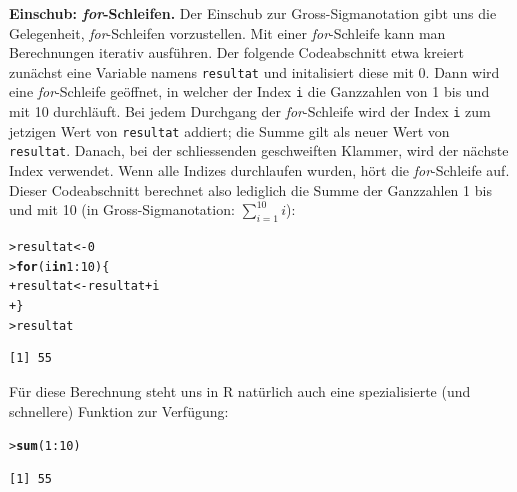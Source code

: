 \documentclass[oneside, 10pt]{book}\usepackage[]{graphicx}\usepackage[]{xcolor}
\makeatletter
\newcommand{\hlnum}[1]{\textcolor[rgb]{0.686,0.059,0.569}{#1}}%
\newcommand{\hlopt}[1]{\textcolor[rgb]{0,0,0}{#1}}%
\newcommand{\hlstd}[1]{\textcolor[rgb]{0.345,0.345,0.345}{#1}}%
\newcommand{\hlkwa}[1]{\textcolor[rgb]{0.161,0.373,0.58}{\textbf{#1}}}%
\newcommand{\hlkwb}[1]{\textcolor[rgb]{0.69,0.353,0.396}{#1}}%
\newcommand{\hlkwd}[1]{\textcolor[rgb]{0.737,0.353,0.396}{\textbf{#1}}}%
\newenvironment{kframe}{%
 \def\at@end@of@kframe{}%
 \ifinner\ifhmode%
  \def\at@end@of@kframe{\end{minipage}}%
  \begin{minipage}{\columnwidth}%
 \fi\fi%
 \def\FrameCommand##1{\hskip\@totalleftmargin \hskip-\fboxsep
 \colorbox{shadecolor}{##1}\hskip-\fboxsep
     \hskip-\linewidth \hskip-\@totalleftmargin \hskip\columnwidth}%
 \MakeFramed {\advance\hsize-\width
   \@totalleftmargin\z@ \linewidth\hsize
   \@setminipage}}%
 {\par\unskip\endMakeFramed%
 \at@end@of@kframe}
\newenvironment{knitrout}{}{} %
\makeatother
\begin{document}
\begin{framed}
\textbf{Einschub: \textit{for}-Schleifen.}
Der Einschub zur Gross-Sigmanotation gibt uns die Gelegenheit,
\textit{for}-Schleifen vorzustellen. Mit einer \textit{for}-Schleife
kann man Berechnungen iterativ ausführen. Der folgende Codeabschnitt
etwa kreiert zunächst eine Variable namens
\texttt{resultat} und initalisiert diese mit 0.
Dann wird eine \textit{for}-Schleife geöffnet, in welcher der
Index \texttt{i} die Ganzzahlen von 1 bis und mit 10 durchläuft.
Bei jedem Durchgang der \textit{for}-Schleife wird
der Index \texttt{i} zum jetzigen Wert von \texttt{resultat}
addiert; die Summe gilt als neuer Wert von \texttt{resultat}.
Danach, bei der schliessenden geschweiften Klammer, wird der
nächste Index verwendet. Wenn alle Indizes durchlaufen wurden,
hört die \textit{for}-Schleife auf.
Dieser Codeabschnitt berechnet also lediglich die Summe
der Ganzzahlen 1 bis und mit 10 (in Gross-Sigmanotation: $\sum_{i=1}^{10} i$):
\begin{knitrout}
\color{fgcolor}\begin{kframe}
\begin{alltt}
\hlstd{> }\hlstd{resultat} \hlkwb{<-} \hlnum{0}
\hlstd{> }\hlkwa{for} \hlstd{(i} \hlkwa{in} \hlnum{1}\hlopt{:}\hlnum{10}\hlstd{) \{}
\hlstd{+ }  \hlstd{resultat} \hlkwb{<-} \hlstd{resultat} \hlopt{+} \hlstd{i}
\hlstd{+ }\hlstd{\}}
\hlstd{> }\hlstd{resultat}
\end{alltt}
\begin{verbatim}
[1] 55
\end{verbatim}
\end{kframe}
\end{knitrout}

Für diese Berechnung steht uns in R natürlich auch eine spezialisierte
(und schnellere) Funktion zur Verfügung:
\begin{knitrout}
\color{fgcolor}\begin{kframe}
\begin{alltt}
\hlstd{> }\hlkwd{sum}\hlstd{(}\hlnum{1}\hlopt{:}\hlnum{10}\hlstd{)}
\end{alltt}
\begin{verbatim}
[1] 55
\end{verbatim}
\end{kframe}
\end{knitrout}


\end{framed}
\end{document}
